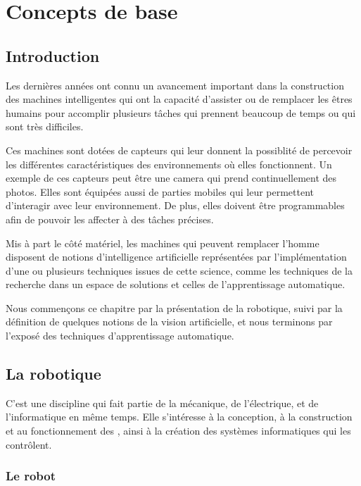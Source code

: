 \chapter{Concepts de base}

\section{Introduction}

Les dernières années ont connu un avancement important dans la construction des
machines intelligentes qui ont la capacité d'assister ou de remplacer les
êtres humains pour accomplir plusieurs tâches qui prennent beaucoup de temps ou
qui sont très difficiles.

Ces machines sont dotées de capteurs qui leur donnent la possiblité de percevoir
les différentes caractéristiques des environnements où elles fonctionnent. Un
exemple de ces capteurs peut être une camera qui prend continuellement des photos.
Elles sont équipées aussi de parties mobiles qui leur permettent
d'interagir avec leur environnement. De plus, elles doivent
être programmables afin de pouvoir les affecter à des tâches précises.

Mis à part le côté matériel, les machines qui peuvent remplacer l'homme disposent
de notions d'intelligence artificielle représentées par l'implémentation d'une ou
plusieurs techniques issues de cette science, comme les techniques de la
recherche dans un espace de solutions et celles de l'apprentissage automatique.

Nous commençons ce chapitre par la présentation de la robotique, suivi par
la définition de quelques notions de la vision artificielle, et nous terminons
par l'exposé des techniques d'apprentissage automatique.

\section{La robotique}

C'est une discipline qui fait partie de la mécanique, de l'électrique, et de
l'informatique en même temps. Elle s'intéresse à la conception, à la
construction et au fonctionnement des , ainsi à la création
des systèmes informatiques qui les contrôlent.

\bigskip

\subsection{Le robot}

